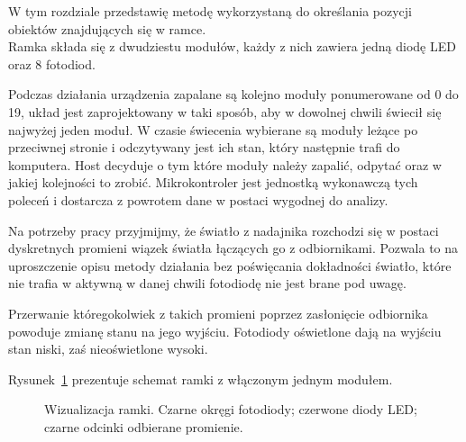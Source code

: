 \label{ch:method}

W tym rozdziale przedstawię metodę wykorzystaną do określania pozycji obiektów znajdujących się w ramce.\\

Ramka składa się z dwudziestu modułów, każdy z nich zawiera jedną diodę LED oraz 8 fotodiod.

Podczas działania urządzenia zapalane są kolejno moduły ponumerowane od 0 do 19, układ jest zaprojektowany w taki sposób, aby w dowolnej chwili świecił się najwyżej jeden moduł. W czasie świecenia wybierane są moduły leżące po przeciwnej stronie i odczytywany jest ich stan, który następnie trafi do komputera. Host decyduje o tym które moduły należy zapalić, odpytać oraz w jakiej kolejności to zrobić. Mikrokontroler jest jednostką wykonawczą tych poleceń i dostarcza z powrotem dane w postaci wygodnej do analizy.

Na potrzeby pracy przyjmijmy, że światło z nadajnika rozchodzi się w postaci dyskretnych promieni \pauza wiązek światła łączących go z odbiornikami. Pozwala to na uproszczenie opisu metody działania bez poświęcania dokładności \pauza światło, które nie trafia w aktywną w danej chwili fotodiodę nie jest brane pod uwagę.

Przerwanie któregokolwiek z takich promieni poprzez zasłonięcie odbiornika powoduje zmianę stanu na jego wyjściu. Fotodiody oświetlone dają na wyjściu stan niski, zaś nieoświetlone \ppauza wysoki.

Rysunek~\ref{fig:scene_rays_sample} prezentuje schemat ramki z włączonym jednym modułem.

\begin{figure}
 
 \caption{Wizualizacja ramki. Czarne okręgi \ppauza fotodiody; czerwone \ppauza diody LED; czarne odcinki \ppauza odbierane promienie.}
 \label{fig:scene_rays_sample}
\end{figure}